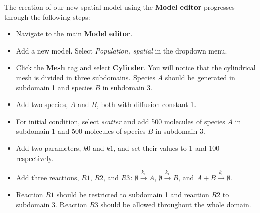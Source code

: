 The creation of our new spatial model using the \textbf{Model editor} progresses through the following steps:
\begin{itemize}
\item Navigate to the main \textbf{Model editor}.
\item Add a new model. Select \textit{Population, spatial} in the dropdown menu.
 \item Click the \textbf{Mesh} tag and select \textbf{Cylinder}. You will notice that the cylindrical mesh is divided in three subdomains. Species $A$ should be generated in subdomain 1 and species $B$ in subdomain 3.
\item Add two species, $A$ and $B$, both with diffusion constant 1.
\item For initial condition, select \textit{scatter} and add 500 molecules of species $A$ in subdomain 1 and 500 molecules of species $B$ in subdomain 3. 
\item Add two parameters, $k0$ and $k1$, and set their values to 1 and 100 respectively.
\item Add three reactions, $R1$, $R2$, and $R3$: $\emptyset\overset{k_1}{\rightarrow} A$, $\emptyset\overset{k_1}{\rightarrow} B$, and $A+B\overset{k_0}{\rightarrow}\emptyset$.
\item Reaction $R1$ should be restricted to subdomain 1 and reaction $R2$ to subdomain 3. Reaction $R3$ should be allowed throughout the whole domain.


\end{itemize}
